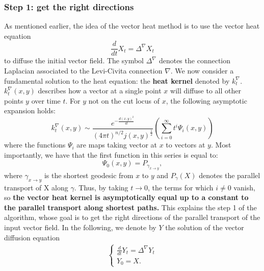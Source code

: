 \documentclass[sigconf, nonacm]{acmart}
\begin{document}
\subsubsection{Step 1: get the right directions}
As mentioned earlier, the idea of the vector heat method is to use the vector heat equation 
\begin{equation} \label{eq:vector-heat}
  \frac{d}{dt} X_t = \Delta^\nabla X_t
  \end{equation}
to diffuse the initial vector field. The symbol $\Delta^\nabla$ denotes the connection Laplacian associated to the Levi-Civita connection $\nabla$. 
We now consider a fundamental solution to the heat equation: the \textbf{heat kernel} denoted by $k_t^\nabla$. $k_t^\nabla(x,y)$ describes how 
a vector at a single point $x$ will diffuse to all other points $y$ over time $t$. For $y$ not on the cut locus of $x$, the following asymptotic
expansion holds:
\begin{equation} \label{eq:asymptotic_expansion}
  k_t^\nabla(x, y) \sim \frac{e^{-\frac{d(x, y)^2}{4t}}}{(4 \pi t)^{n/2} j(x, y)^\frac{1}{2}} 
\left( \sum_{i=0}^{\infty} t^i \Psi_i(x, y) \right)
  \end{equation}
where the functions $\Psi_i$ are maps taking vector at $x$ to vectors at $y$. Most importantly, we have that the first function in this series 
is equal to:
$$\Psi_0(x,y) = P_{\gamma_{x\rightarrow y}}, $$ where $\gamma_{x \rightarrow y}$ is the shortest geodesic from $x$ to $y$ and $P_\gamma(X)$
denotes the parallel transport of X along $\gamma$. Thus, by taking $t\rightarrow 0$, the terms for which $i\neq 0$ vanish, so \textbf{the vector heat 
kernel is asymptotically equal up to a constant to the parallel transport along shortest paths.} This explains the step 1 of the algorithm, whose goal 
is to get the right directions of the parallel transport of the input vector field. In the following, we denote by $Y$ the solution of the 
vector diffusion equation 
\begin{align*}
  \begin{cases}
  \frac{d}{dt}Y_t  = \Delta^\nabla Y_t \\
  Y_0  = X.
\end{cases}
\end{align*}
\end{document}
